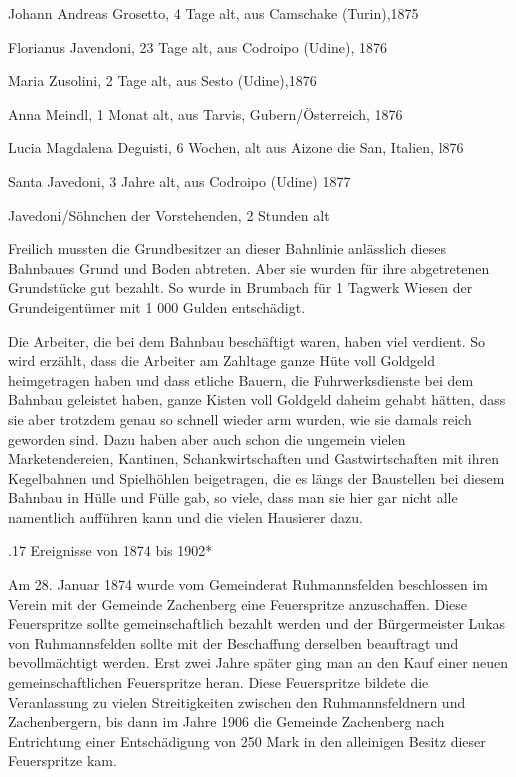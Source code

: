 Johann Andreas Grosetto, 4 Tage alt, aus Camschake (Turin),1875

Florianus Javendoni, 23 Tage alt, aus Codroipo (Udine), 1876

Maria Zusolini, 2 Tage alt, aus Sesto (Udine),1876

Anna Meindl, 1 Monat alt, aus Tarvis, Gubern/Österreich, 1876

Lucia Magdalena Deguisti, 6 Wochen, alt aus Aizone die San, Italien, l876

Santa Javedoni, 3 Jahre alt, aus Codroipo (Udine) 1877

Javedoni/Söhnchen der Vorstehenden, 2 Stunden alt



Freilich mussten die Grundbesitzer an dieser Bahnlinie anlässlich dieses
Bahnbaues Grund und Boden abtreten. Aber sie wurden für ihre abgetretenen
Grundstücke gut bezahlt. So wurde in Brumbach für 1 Tagwerk Wiesen der
Grundeigentümer mit 1 000 Gulden entschädigt.

Die Arbeiter, die bei dem Bahnbau beschäftigt waren, haben viel verdient. So
wird erzählt, dass die Arbeiter am Zahltage ganze Hüte voll Goldgeld
heimgetragen haben und dass etliche Bauern, die Fuhrwerksdienste bei dem Bahnbau
geleistet haben, ganze Kisten voll Goldgeld daheim gehabt hätten, dass sie aber
trotzdem genau so schnell wieder arm wurden, wie sie damals reich geworden sind.
Dazu haben aber auch schon die ungemein vielen Marketendereien, Kantinen,
Schankwirtschaften und Gastwirtschaften mit ihren Kegelbahnen und Spielhöhlen
beigetragen, die es längs der Baustellen bei diesem Bahnbau in Hülle und Fülle
gab, so viele, dass man sie hier gar nicht alle namentlich aufführen kann und
die vielen Hausierer dazu.

.17 Ereignisse von 1874 bis 1902*

Am 28. Januar 1874 wurde vom Gemeinderat Ruhmannsfelden beschlossen im Verein
mit der Gemeinde Zachenberg eine Feuerspritze anzuschaffen. Diese Feuerspritze
sollte gemeinschaftlich bezahlt werden und der Bürgermeister Lukas von
Ruhmannsfelden sollte mit der Beschaffung derselben beauftragt und
bevollmächtigt werden. Erst zwei Jahre später ging man an den Kauf einer neuen
gemeinschaftlichen Feuerspritze heran. Diese Feuerspritze bildete die
Veranlassung zu vielen Streitigkeiten zwischen den Ruhmannsfeldnern und
Zachenbergern, bis dann im Jahre 1906 die Gemeinde Zachenberg nach Entrichtung
einer Entschädigung von 250 Mark in den alleinigen Besitz dieser Feuerspritze
kam.

